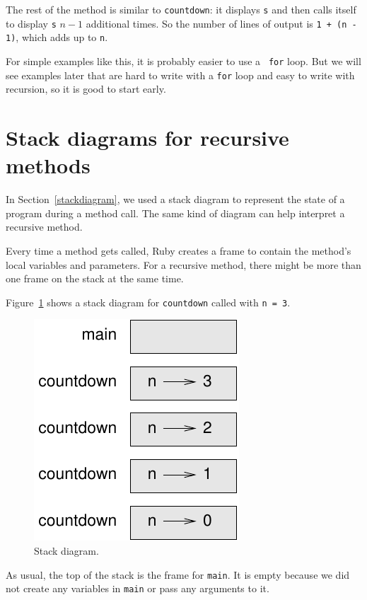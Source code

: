 \documentclass[10pt]{book}
\begin{document}
The rest of the method is similar to {\tt countdown}: it displays
{\tt s} and then calls itself to display {\tt s} $n-1$ additional
times.  So the number of lines of output is {\tt 1 + (n - 1)}, which
adds up to {\tt n}.

For simple examples like this, it is probably easier to use a {\tt
for} loop.  But we will see examples later that are hard to write
with a {\tt for} loop and easy to write with recursion, so it is
good to start early.


\section{Stack diagrams for recursive methods}
\label{recursive.stack}

In Section~\ref{stackdiagram}, we used a stack diagram to represent
the state of a program during a method call.  The same kind of
diagram can help interpret a recursive method.

Every time a method gets called, Ruby creates a
frame to contain the method's local variables and parameters.
For a recursive method, there might be more than one frame on the
stack at the same time.

Figure~\ref{fig.stack2} shows a stack diagram for {\tt countdown} called with
{\tt n = 3}.

\begin{figure}
\centerline
{\includegraphics[scale=0.8]{figs/stack2.pdf}}
\caption{Stack diagram.}
\label{fig.stack2}
\end{figure}


As usual, the top of the stack is the frame for \verb"main".
It is empty because we did not create any variables in 
\verb"main" or pass any arguments to it.
\end{document}
